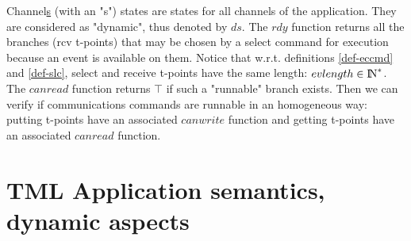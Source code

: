 \documentclass{article}
\newcommand{\NAT}{\mbox{\normalfont I$\!$N}}
\begin{document}
Channel\underline{s} (with an "s") states are states for all channels of the application. They are considered as "dynamic", thus denoted by $ds$. The $rdy$ function returns all the branches (rcv t-points) that may be chosen by a select command for execution because an event is available on them. Notice that w.r.t. definitions \ref{def-eccmd} and \ref{def-slc}, select and receive t-points have the same length: $evlength\in\NAT^*$. The $canread$ function returns $\top$ if such a "runnable" branch exists. Then we can verify if communications commands are runnable in an homogeneous way: putting t-points have an associated $canwrite$ function and getting t-points have an associated $canread$ function.



\section{TML Application semantics, dynamic aspects}\label{sec-dyn}

\end{document}
